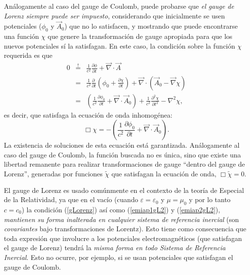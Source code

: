 Análogamente al caso del gauge de Coulomb, puede probarse que \textit{el gauge de Lorenz siempre puede ser impuesto}, considerando que inicialmente se usen potenciales ($\phi_0$ y $\vec{A}_0$) que no lo satisfacen, y mostrando que puede encontrarse una función $\chi$ que genere la transformación de gauge apropiada para que los nuevos potenciales sí la satisfagan. En este caso, la condición sobre la función $\chi$ requerida es que
\begin{eqnarray}
0&\stackrel{!}{=}&\frac{1}{c^2}\frac{\partial\phi}{\partial t}+\vec{\nabla}\cdot\vec{A} \\
&=&\frac{1}{c^2}\frac{\partial\ }{\partial t}\left(\phi_0+\frac{\partial\chi}{\partial t}\right)+\vec{\nabla}\cdot\left(\vec{A}_0-\vec\nabla\chi\right) \\
&=&\left(\frac{1}{c^2}\frac{\partial\phi_0}{\partial t} +\vec{\nabla}\cdot\vec{A}_0\right) +\frac{1}{c^2}\frac{\partial^2\chi }{\partial t^2}-\nabla^2\chi,
\end{eqnarray}
es decir, que satisfaga la ecuación de onda inhomogénea:
\begin{equation}
\Box\chi=-\left(\frac{1}{c^2}\frac{\partial\phi_0}{\partial t} +\vec{\nabla}\cdot\vec{A}_0\right).
\end{equation}
La existencia de soluciones de esta ecuación está garantizada. Análogamente al caso del gauge de Coulomb, la función buscada no es única, sino que existe una libertad remanente para realizar transformaciones de gauge ``dentro del gauge de Lorenz'', generadas por funciones $\tilde\chi$ que satisfagan la ecuación de onda, $\Box\tilde\chi=0$. 

El gauge de Lorenz es usado comúnmente en el contexto de la teoría de Especial de la Relatividad, ya que en el vacío (cuando $\varepsilon=\varepsilon_0$ y $\mu=\mu_0$ y por lo tanto $c=c_0$) la condición (\ref{gLorenz}) así como (\ref{emiap1gL2}) y (\ref{emiap2gL2}), \textit{mantienen su forma inalterada en cualquier sistema de referencia inercial} (son \textit{covariantes} bajo transformaciones de Lorentz). Esto tiene como consecuencia que toda expresión que involucre a los potenciales electromagnéticos (que satisfagan el gauge de Lorenz) tendrá la \textit{misma forma en todo Sistema de Referencia Inercial}. Esto no ocurre, por ejemplo, si se usan potenciales que satisfagan el gauge de Coulomb.
